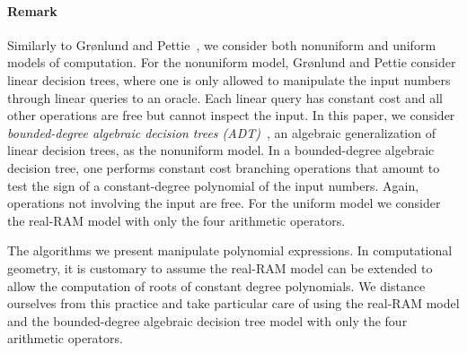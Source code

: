 \paragraph{Remark}

Similarly to Gr\o nlund and Pettie~\cite{GP18}, we consider both nonuniform
and uniform models of computation.
%
For the nonuniform model, Gr\o nlund and Pettie consider linear
decision trees, where one is only allowed to manipulate the input numbers
through linear queries to an oracle. Each linear query has constant cost and
all other operations are free but cannot inspect the input.
%
In this paper, we consider
\emph{bounded-degree algebraic decision trees (ADT)}~\cite{R72,Y81,SY82},
an algebraic generalization of linear decision trees,
as the nonuniform model. In a bounded-degree algebraic decision tree, one
performs constant cost branching operations that amount to test the sign of
a constant-degree polynomial of the input numbers. Again,
operations not involving the input are free.
%
For the uniform model we consider the real-RAM model with only the four
arithmetic operators.

The algorithms we present manipulate polynomial expressions.
%
In computational geometry, it is customary to assume the real-RAM model can be
extended to allow the computation of roots of constant degree polynomials.
We distance ourselves from this practice and take particular care
of using the real-RAM model and the bounded-degree algebraic decision tree
model with only the four arithmetic operators.

